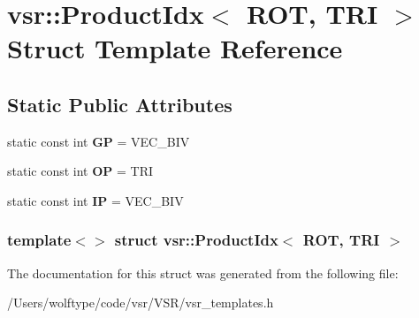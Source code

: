 \hypertarget{structvsr_1_1_product_idx_3_01_r_o_t_00_01_t_r_i_01_4}{\section{vsr\-:\-:Product\-Idx$<$ R\-O\-T, T\-R\-I $>$ Struct Template Reference}
\label{structvsr_1_1_product_idx_3_01_r_o_t_00_01_t_r_i_01_4}
}
\subsection*{Static Public Attributes}
\begin{DoxyCompactItemize}
\item 
\hypertarget{structvsr_1_1_product_idx_3_01_r_o_t_00_01_t_r_i_01_4_a3efe8e2218f9793e5fcac76f49dfc395}{static const int {\bfseries G\-P} = V\-E\-C\-\_\-\-B\-I\-V}\label{structvsr_1_1_product_idx_3_01_r_o_t_00_01_t_r_i_01_4_a3efe8e2218f9793e5fcac76f49dfc395}

\item 
\hypertarget{structvsr_1_1_product_idx_3_01_r_o_t_00_01_t_r_i_01_4_a8d4592b886e70a54234dda6fe78b067a}{static const int {\bfseries O\-P} = T\-R\-I}\label{structvsr_1_1_product_idx_3_01_r_o_t_00_01_t_r_i_01_4_a8d4592b886e70a54234dda6fe78b067a}

\item 
\hypertarget{structvsr_1_1_product_idx_3_01_r_o_t_00_01_t_r_i_01_4_aed2cb8be9094563bc915395cac1c9857}{static const int {\bfseries I\-P} = V\-E\-C\-\_\-\-B\-I\-V}\label{structvsr_1_1_product_idx_3_01_r_o_t_00_01_t_r_i_01_4_aed2cb8be9094563bc915395cac1c9857}

\end{DoxyCompactItemize}
\subsubsection*{template$<$$>$ struct vsr\-::\-Product\-Idx$<$ R\-O\-T, T\-R\-I $>$}



The documentation for this struct was generated from the following file\-:\begin{DoxyCompactItemize}
\item 
/\-Users/wolftype/code/vsr/\-V\-S\-R/vsr\-\_\-templates.\-h\end{DoxyCompactItemize}
